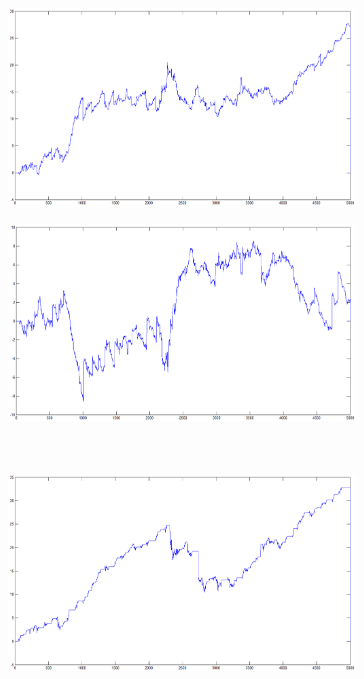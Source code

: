 \documentclass{tewiart}
\begin{document}
\FloatBarrier
\begin{figure}[h]
\centering
\begin{minipage}{.49\linewidth}
\centering
\includegraphics[width=0.82\textwidth]{images/chfjpyA.eps}
\label{jedno}
\end{minipage}
\begin{minipage}{.49\linewidth}
\centering
\includegraphics[width=0.82\textwidth]{images/chfjpyB.eps}
\label{dwu}
\end{minipage}
\\
\begin{minipage}{.49\linewidth}
\centering
\includegraphics[width=0.82\textwidth]{images/chfjpyC.eps}
\label{cztero}

\end{minipage}
\end{figure}
\end{document}
